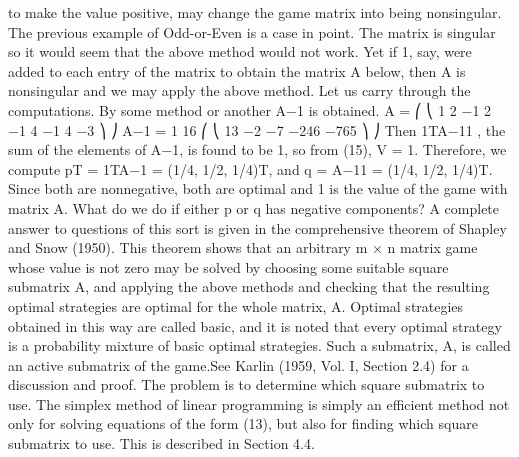 \documentclass[]{report}
\begin{document}
to make the value positive, may change the game matrix into being nonsingular. The
previous example of Odd-or-Even is a case in point. The matrix is singular so it would
seem that the above method would not work. Yet if 1, say, were added to each entry of
the matrix to obtain the matrix A below, then A is nonsingular and we may apply the
above method. Let us carry through the computations. By some method or another A−1
is obtained.
A =
⎛
⎝
1 2 −1
2 −1 4
−1 4 −3
⎞
⎠ A−1 = 1
16
⎛
⎝
13 −2 −7
−246
−765
⎞
⎠
Then 1TA−11 , the sum of the elements of A−1, is found to be 1, so from (15), V = 1.
Therefore, we compute pT = 1TA−1 = (1/4, 1/2, 1/4)T, and q = A−11 = (1/4, 1/2, 1/4)T.
Since both are nonnegative, both are optimal and 1 is the value of the game with matrix
A.
What do we do if either p or q has negative components? A complete answer to
questions of this sort is given in the comprehensive theorem of Shapley and Snow (1950).
This theorem shows that an arbitrary m × n matrix game whose value is not zero may be
solved by choosing some suitable square submatrix A, and applying the above methods
and checking that the resulting optimal strategies are optimal for the whole matrix, A.
Optimal strategies obtained in this way are called basic, and it is noted that every optimal
strategy is a probability mixture of basic optimal strategies. Such a submatrix, A, is called
an active submatrix of the game.See Karlin (1959, Vol. I, Section 2.4) for a discussion and
proof. The problem is to determine which square submatrix to use. The simplex method
of linear programming is simply an efficient method not only for solving equations of the
form (13), but also for finding which square submatrix to use. This is described in Section
4.4.
\end{document}
